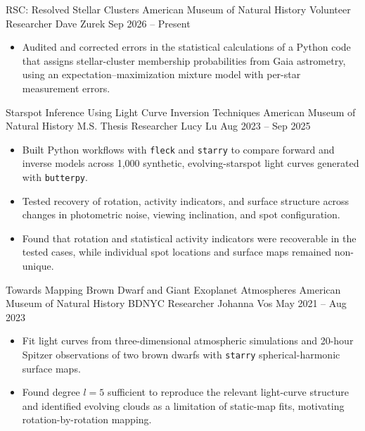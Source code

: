 \vspace{0.2em}

\researchentry
  {RSC: Resolved Stellar Clusters}
  {American Museum of Natural History}
  {Volunteer Researcher}
  {Dave Zurek}
  {Sep 2026 -- Present}
  {}
\begin{itemize}[
  leftmargin=1em,
  label={--},
  itemsep=2pt,
  topsep=0pt,
  parsep=0pt,
  partopsep=0pt
]
  \item Audited and corrected errors in the statistical calculations of a
  Python code that assigns stellar-cluster membership probabilities from Gaia
  astrometry, using an expectation--maximization mixture model with per-star
  measurement errors.
\end{itemize}

\vspace{0.2em}

\researchentry
  {Starspot Inference Using Light Curve Inversion Techniques}
  {American Museum of Natural History}
  {M.S. Thesis Researcher}
  {Lucy Lu}
  {Aug 2023 -- Sep 2025}
  {}
\begin{itemize}[
  leftmargin=1em,
  label={--},
  itemsep=2pt,
  topsep=0pt,
  parsep=0pt,
  partopsep=0pt
]
  \item Built Python workflows with \texttt{fleck} and \texttt{starry} to
  compare forward and inverse models across 1,000 synthetic, evolving-starspot
  light curves generated with \texttt{butterpy}.

  \item Tested recovery of rotation, activity indicators, and surface structure
  across changes in photometric noise, viewing inclination, and spot
  configuration.

  \item Found that rotation and statistical activity indicators were
  recoverable in the tested cases, while individual spot locations and surface
  maps remained non-unique.
\end{itemize}

\vspace{0.2em}

\researchentry
  {Towards Mapping Brown Dwarf and Giant Exoplanet Atmospheres}
  {American Museum of Natural History}
  {BDNYC Researcher}
  {Johanna Vos}
  {May 2021 -- Aug 2023}
  {}
\begin{itemize}[
  leftmargin=1em,
  label={--},
  itemsep=2pt,
  topsep=0pt,
  parsep=0pt,
  partopsep=0pt
]
  \item Fit light curves from three-dimensional atmospheric simulations and
  20-hour Spitzer observations of two brown dwarfs with \texttt{starry}
  spherical-harmonic surface maps.

  \item Found degree $l=5$ sufficient to reproduce the relevant light-curve
  structure and identified evolving clouds as a limitation of static-map fits,
  motivating rotation-by-rotation mapping.
\end{itemize}

